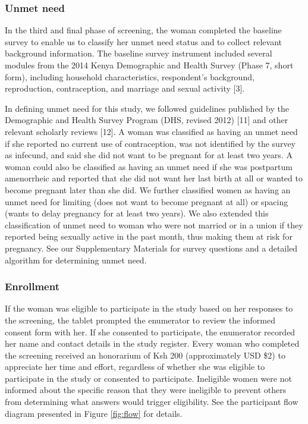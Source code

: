 \documentclass[man]{apa6}
\theoremstyle{definition}
\theoremstyle{definition}
\theoremstyle{definition}
\theoremstyle{remark}
\begin{document}
\hypertarget{unmet-need}{%
\subsubsection{Unmet need}\label{unmet-need}}

In the third and final phase of screening, the woman completed the
baseline survey to enable us to classify her unmet need status and to
collect relevant background information. The baseline survey instrument
included several modules from the 2014 Kenya Demographic and Health
Survey (Phase 7, short form), including household characteristics,
respondent's background, reproduction, contraception, and marriage and
sexual activity {[}3{]}.

In defining unmet need for this study, we followed guidelines published
by the Demographic and Health Survey Program (DHS, revised 2012)
{[}11{]} and other relevant scholarly reviews {[}12{]}. A woman was
classified as having an unmet need if she reported no current use of
contraception, was not identified by the survey as infecund, and said
she did not want to be pregnant for at least two years. A woman could
also be classified as having an unmet need if she was postpartum
amenorrheic and reported that she did not want her last birth at all or
wanted to become pregnant later than she did. We further classified
women as having an unmet need for limiting (does not want to become
pregnant at all) or spacing (wants to delay pregnancy for at least two
years). We also extended this classification of unmet need to woman who
were not married or in a union if they reported being sexually active in
the past month, thus making them at risk for pregnancy. See our
Supplementary Materials for survey questions and a detailed algorithm
for determining unmet need.

\hypertarget{enrollment}{%
\subsubsection{Enrollment}\label{enrollment}}

If the woman was eligible to participate in the study based on her
responses to the screening, the tablet prompted the enumerator to review
the informed consent form with her. If she consented to participate, the
enumerator recorded her name and contact details in the study register.
Every woman who completed the screening received an honorarium of Ksh
200 (approximately USD \$2) to appreciate her time and effort,
regardless of whether she was eligible to participate in the study or
consented to participate. Ineligible women were not informed about the
specific reason that they were ineligible to prevent others from
determining what answers would trigger eligibility. See the participant
flow diagram presented in Figure \ref{fig:flow} for details.
\end{document}
